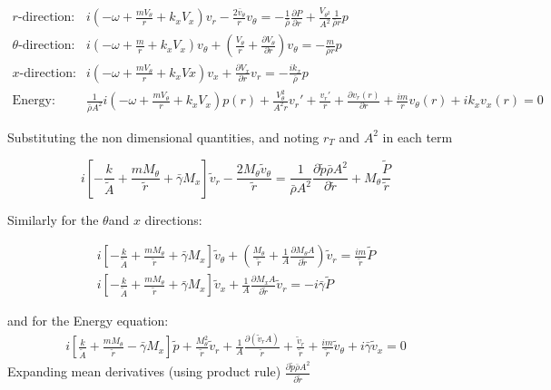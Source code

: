 \begin{align*}
r\text{-direction: }& i\left(-\omega + \frac{ m V_{\theta}}{r} +  k_x V_x \right) v_r - \frac{2 \bar{v}_{\theta}}{r}v_{\theta}  = -\frac{1}{\bar{\rho}} \frac{\partial P}{\partial r}+ \frac{V_{\theta^2}}{A^2}\frac{1}{\bar{\rho} r}p\\
\theta\text{-direction: }& i\left(-\omega + \frac{ m}{r} +  k_x V_x \right) v_{\theta} + \left(\frac{V_{\theta}}{r} +  \frac{\partial V_{\theta}}{\partial r}\right)v_\theta= -\frac{m}{\bar{\rho}r}p \\ 
x\text{-direction: } &i\left(-\omega + \frac{mV_{\theta}}{r} +  k_xVx\right)v_x + \frac{\partial V_x}{\partial r} v_r = - \frac{i
	k_x}{\bar{\rho}}p\\
\text{Energy: }&\frac{1}{\bar{\rho} A^2} i\left(-\omega + \frac{mV_{\theta}}{r} + k_xV_x  
\right)p(r)  +
\frac{V_{\theta}^2}{A^2 r}v_r'+ \frac{v_r'}{r} +
\frac{\partial v_r(r)}{\partial r}+ 
\frac{im}{r} v_{\theta}(r)
+
ik_xv_x(r) 
= 0
\end{align*}

Substituting the non dimensional quantities, and noting $r_T$ and $A^2$ in each term

\[ i\left[ 
- \frac{k}{\tilde{A}} + 
\frac{m M_{\theta}}{\tilde{r}} + 
\bar{\gamma} M_x \right] 
\tilde{v}_r - 
\frac{2 M_{\theta} \tilde{v}_{\theta}}{\tilde{r}} = 
\frac{1}{\bar{\rho} A^2}\frac{\partial \tilde{p}\bar{\rho} A^2}{\partial \tilde{r}} + 
M_{\theta}\frac{\tilde{P}}{\tilde{r}}\]

Similarly for the $\theta$and $x$ directions:

\begin{align*}
	 i\left[ - \frac{k}{\tilde{A}} + \frac{m M_{\theta}}{\tilde{r}} + \bar{\gamma} M_x \right] \tilde{v}_{\theta} + \left(\frac{ M_{\theta}}{\tilde{r}}  + \frac{1}{A} \frac{\partial M_{\theta}A}{\partial \tilde{r}}\right)\tilde{v}_r = \frac{i m}{\tilde{r}}\tilde{P}\\
	 i\left[ - \frac{k}{\tilde{A}} + \frac{m M_{\theta}}{\tilde{r}} + \bar{\gamma} M_x \right] \tilde{v}_x  + \frac{1}{A} \frac{\partial M_x A}{\partial \tilde{r}}\tilde{v}_r = -i \bar{\gamma}\tilde{P}
\end{align*}

and for the Energy equation:
\begin{align*}
	 i \left[ \frac{k}{\tilde{A}} + 
	 \frac{mM_{\theta}}{\tilde{r}} - 
	 \bar{\gamma}M_x \right] \tilde{p} + 
	 \frac{M_{\theta}^2}{\tilde{r}}\tilde{v}_r + 
	 \frac{1}{A}\frac{\partial ( \tilde{v}_r A)}{\tilde{r}}+ 
	 \frac{\tilde{v}_r  }{\tilde{r}} + \frac{im}{\tilde{r}}\tilde{v}_\theta + i \bar{\gamma} \tilde{v}_x = 0
\end{align*}
\[\]
Expanding mean derivatives (using product rule) $\frac{\partial \tilde{p}\bar{\rho} A^2}{\partial \tilde{r}} $

